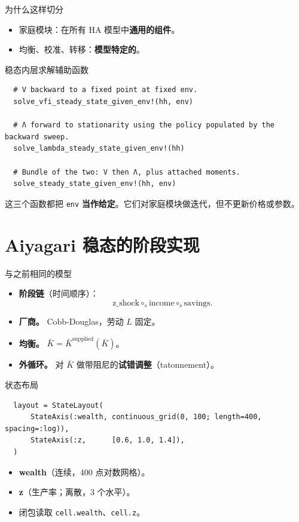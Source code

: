 \documentclass[10pt,aspectratio=169]{beamer}
\newcommand{\circs}{\mathbin{\circ_s}}
\begin{document}
\begin{frame}{为什么这样切分}
  \begin{itemize}
    \item 家庭模块：在所有 HA 模型中\textbf{通用的组件}。
    \item 均衡、校准、转移：\textbf{模型特定的}。
  \end{itemize}
\end{frame}

\begin{frame}[fragile]{稳态内层求解辅助函数}
  \begin{lstlisting}
  # V backward to a fixed point at fixed env.
  solve_vfi_steady_state_given_env!(hh, env)

  # Λ forward to stationarity using the policy populated by the backward sweep.
  solve_lambda_steady_state_given_env!(hh)

  # Bundle of the two: V then Λ, plus attached moments.
  solve_steady_state_given_env!(hh, env)
  \end{lstlisting}
  这三个函数都把 \texttt{env} \textbf{当作给定}。它们对家庭模块做迭代，但不更新价格或参数。
\end{frame}

\section{Aiyagari 稳态的阶段实现}

\begin{frame}{与之前相同的模型}
  \begin{itemize}
    \item \textbf{阶段链}（时间顺序）：\[ \text{z\_shock} \circs \text{income} \circs \text{savings}. \]
    \item \textbf{厂商。} Cobb-Douglas，劳动 $L$ 固定。
    \item \textbf{均衡。} $\bar K = \bar K^{\mathrm{supplied}}(\bar K)$。
    \item \textbf{外循环。} 对 $\bar K$ 做带阻尼的\textbf{试错调整}（tatonnement）。
  \end{itemize}
\end{frame}

\begin{frame}[fragile]{状态布局}
  \begin{lstlisting}
  layout = StateLayout(
      StateAxis(:wealth, continuous_grid(0, 100; length=400, spacing=:log)),
      StateAxis(:z,      [0.6, 1.0, 1.4]),
  )
  \end{lstlisting}
  \begin{itemize}
    \item \textbf{wealth}（连续，400 点对数网格）。
    \item \textbf{z}（生产率；离散，3 个水平）。
    \item 闭包读取 \texttt{cell.wealth}、\texttt{cell.z}。
  \end{itemize}
\end{frame}
\end{document}
